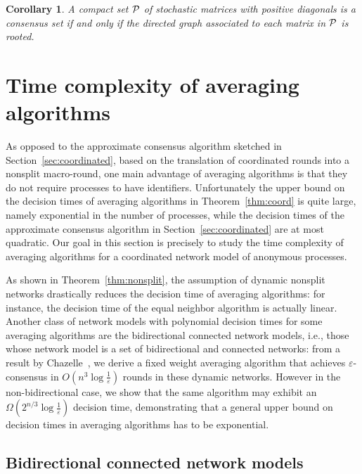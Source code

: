\documentclass[a4paper]{article}
\theoremstyle{newthm}
\newtheorem{cor}[thm]{Corollary}
\begin{document}
\begin{cor}\label{cor:characterizationmath}
A compact set ${\cal P}$ of stochastic matrices with positive diagonals is a consensus set if and only if 
	the directed graph associated to each matrix in ${\cal P}$ is rooted.
\end{cor}

\section{Time complexity of averaging algorithms}

As opposed to the approximate consensus algorithm sketched in Section~\ref{sec:coordinated}, 
	based on the translation of coordinated rounds into a nonsplit  macro-round, 
	one main advantage of averaging algorithms is that they do not require processes to have identifiers. 
Unfortunately the upper bound on the decision times of averaging algorithms in Theorem~\ref{thm:coord} is quite large, 
	namely exponential in the number of processes, while the decision times of the approximate consensus algorithm  in Section~\ref{sec:coordinated} 
	are at most quadratic.
Our goal in this section is precisely to study the time complexity of averaging  algorithms for
	a coordinated network model of  anonymous processes.
		

As shown in Theorem~\ref{thm:nonsplit}, the assumption of dynamic
     nonsplit networks drastically reduces the decision time  of
     averaging algorithms: for instance, the decision time of the
     equal neighbor algorithm is actually linear.
Another class of network models with polynomial decision times for
     some averaging algorithms are the bidirectional connected network
     models, i.e., those whose network model is a set of bidirectional
     and connected networks: from a result by Chazelle~\cite{Cha13},
     we derive a fixed weight averaging algorithm that achieves
     $\varepsilon$-consensus in $O(n^3 \log\frac{1}{\varepsilon})$
     rounds in these dynamic networks.
However in the non-bidirectional case, we show that the same algorithm
     may exhibit an $\Omega(2^{n/3}\log\frac{1}{\varepsilon})$
     decision time, demonstrating that a general upper bound on
     decision times in averaging algorithms has to be exponential.
	




\subsection{Bidirectional connected network models}
\end{document}
